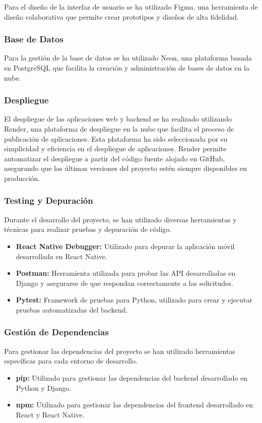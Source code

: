 Para el diseño de la interfaz de usuario se ha utilizado Figma, una herramienta de diseño colaborativa que permite crear prototipos y diseños de alta fidelidad.

\subsubsection{Base de Datos}

Para la gestión de la base de datos se ha utilizado Neon, una plataforma basada en PostgreSQL que facilita la creación y administración de bases de datos en la nube.

\subsubsection{Despliegue}

El despliegue de las aplicaciones web y backend se ha realizado utilizando Render, una plataforma de despliegue en la nube que facilita el proceso de publicación de aplicaciones.
Esta plataforma ha sido seleccionada por su simplicidad y eficiencia en el despliegue de aplicaciones. Render permite automatizar el despliegue a partir del código fuente alojado en GitHub, asegurando que las últimas versiones del proyecto estén siempre disponibles en producción.


\subsubsection{Testing y Depuración}

Durante el desarrollo del proyecto, se han utilizado diversas herramientas y técnicas para realizar pruebas y depuración de código.

\begin{itemize}
    \item \textbf{React Native Debugger:} Utilizado para depurar la aplicación móvil desarrollada en React Native.
    \item \textbf{Postman:} Herramienta utilizada para probar las API desarrolladas en Django y asegurarse de que respondan correctamente a las solicitudes.
    \item \textbf{Pytest:} Framework de pruebas para Python, utilizado para crear y ejecutar pruebas automatizadas del backend.
\end{itemize}

\subsubsection{Gestión de Dependencias}

Para gestionar las dependencias del proyecto se han utilizado herramientas específicas para cada entorno de desarrollo.

\begin{itemize}
    \item \textbf{pip:} Utilizado para gestionar las dependencias del backend desarrollado en Python y Django.
    \item \textbf{npm:} Utilizado para gestionar las dependencias del frontend desarrollado en React y React Native.
\end{itemize}
